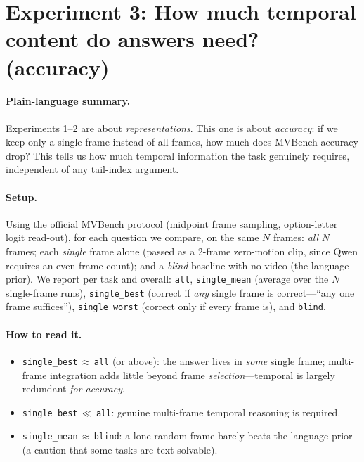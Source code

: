 \documentclass[11pt]{article}
\begin{document}
\section{Experiment 3: How much temporal content do answers need? (accuracy)}

\paragraph{Plain-language summary.}
Experiments 1--2 are about \emph{representations}. This one is about \emph{accuracy}:
if we keep only a single frame instead of all frames, how much does MVBench accuracy
drop? This tells us how much temporal information the task genuinely requires,
independent of any tail-index argument.

\paragraph{Setup.} Using the official MVBench protocol (midpoint frame sampling,
option-letter logit read-out), for each question we compare, on the same $N$ frames:
\emph{all} $N$ frames; each \emph{single} frame alone (passed as a 2-frame
zero-motion clip, since Qwen requires an even frame count); and a \emph{blind}
baseline with no video (the language prior). We report per task and overall:
\texttt{all}, \texttt{single\_mean} (average over the $N$ single-frame runs),
\texttt{single\_best} (correct if \emph{any} single frame is correct---``any one
frame suffices''), \texttt{single\_worst} (correct only if every frame is), and
\texttt{blind}.

\paragraph{How to read it.}
\begin{itemize}
\item \texttt{single\_best}$\,\approx\,$\texttt{all} (or above): the answer lives in
      \emph{some} single frame; multi-frame integration adds little beyond frame
      \emph{selection}---temporal is largely redundant \emph{for accuracy}.
\item \texttt{single\_best}$\,\ll\,$\texttt{all}: genuine multi-frame temporal
      reasoning is required.
\item \texttt{single\_mean}$\,\approx\,$\texttt{blind}: a lone random frame barely
      beats the language prior (a caution that some tasks are text-solvable).
\end{itemize}
\end{document}
